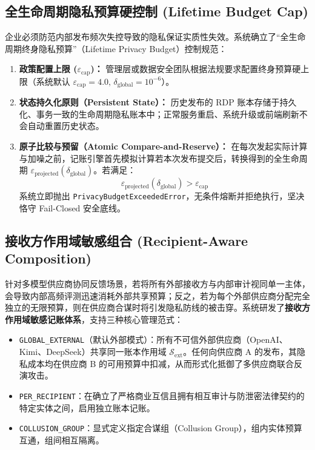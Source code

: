 \subsection{全生命周期隐私预算硬控制 (Lifetime Budget Cap)}
企业必须防范内部发布频次失控导致的隐私保证实质性失效。系统确立了“全生命周期终身隐私预算”（Lifetime Privacy Budget）控制规范：
\begin{enumerate}[label=(\alph*), leftmargin=2.5em]
  \item \textbf{政策配置上限 ($\varepsilon_{\text{cap}}$)：} 管理层或数据安全团队根据法规要求配置终身预算硬上限（系统默认 $\varepsilon_{\text{cap}} = 4.0, \, \delta_{\text{global}} = 10^{-6}$）。
  \item \textbf{状态持久化原则（Persistent State）：} 历史发布的 RDP 账本存储于持久化、事务一致的生命周期隐私账本中；正常服务重启、系统升级或前端刷新不会自动重置历史状态。
  \item \textbf{原子比较与预留（Atomic Compare-and-Reserve）：} 在每次发起实际计算与加噪之前，记账引擎首先模拟计算若本次发布提交后，转换得到的全生命周期 $\varepsilon_{\text{projected}}(\delta_{\text{global}})$。若满足：
    \begin{equation}
      \varepsilon_{\text{projected}}(\delta_{\text{global}}) > \varepsilon_{\text{cap}}
    \end{equation}
    系统立即抛出 \texttt{PrivacyBudgetExceededError}，无条件熔断并拒绝执行，坚决恪守 Fail-Closed 安全底线。
\end{enumerate}

\subsection{接收方作用域敏感组合 (Recipient-Aware Composition)}
针对多模型供应商协同反馈场景，若将所有外部接收方与内部审计视同单一主体，会导致内部高频评测迅速消耗外部共享预算；反之，若为每个外部供应商分配完全独立的无限预算，则在供应商合谋时将引发隐私防线的被击穿。系统研发了\textbf{接收方作用域敏感记账体系}，支持三种核心管理范式：
\begin{itemize}[leftmargin=2em]
  \item \texttt{GLOBAL\_}\allowbreak\texttt{EXTERNAL}（默认外部模式）：所有不可信外部供应商（OpenAI、Kimi、DeepSeek）共享同一账本作用域 $\mathcal{S}_{\text{ext}}$。任何向供应商 A 的发布，其隐私成本均在供应商 B 的可用预算中扣减，从而形式化抵御了多供应商联合反演攻击。
  \item \texttt{PER\_RECIPIENT}：在确立了严格商业互信且拥有相互审计与防泄密法律契约的特定实体之间，启用独立账本记账。
  \item \texttt{COLLUSION\_GROUP}：显式定义指定合谋组（Collusion Group），组内实体预算互通，组间相互隔离。
\end{itemize}

